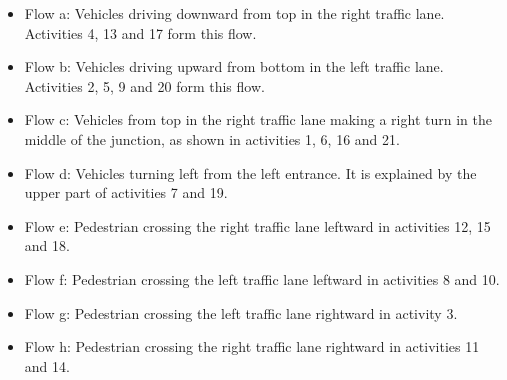 \begin{itemize}
	\item Flow a: Vehicles driving downward from top in the right traffic lane. Activities 4, 13 and 17 form this flow.
	\item Flow b: Vehicles driving upward from bottom in the left traffic lane. Activities 2, 5, 9 and 20 form this flow.
	\item Flow c: Vehicles from top in the right traffic lane making a right turn in the middle of the junction, as shown in activities 1, 6, 16 and 21.
	\item Flow d: Vehicles turning left from the left entrance. It is explained by the upper part of activities 7 and 19.
	\item Flow e: Pedestrian crossing the right traffic lane leftward in activities 12, 15 and 18.
	\item Flow f: Pedestrian crossing the left traffic lane leftward in activities 8 and 10.
	\item Flow g: Pedestrian crossing the left traffic lane rightward in activity 3.
	\item Flow h: Pedestrian crossing the right traffic lane rightward in activities 11 and 14.
\end{itemize}

